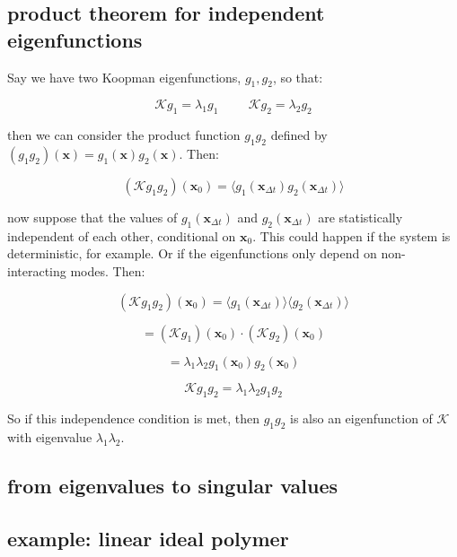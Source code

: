 \documentclass[]{article}
\newcommand{\p}[1]{\left( #1 \right)}
\newcommand{\w}[1]{\mathbf{#1}}
\newcommand{\Kp}{\mathcal{K}}
\begin{document}
\subsection{product theorem for independent eigenfunctions}

Say we have two Koopman eigenfunctions, $g_1, g_2$, so that:

$$
\Kp g_1 = \lambda_1 g_1 \hspace{1cm} \Kp g_2 = \lambda_2 g_2
$$

then we can consider the product function $g_1g_2$ defined by $(g_1g_2)(\w{x}) = g_1(\w{x})g_2(\w{x})$. Then:

$$
\p{\Kp g_1g_2}(\w{x}_0) = \langle g_1(\w{x}_{\Delta t})g_2(\w{x}_{\Delta t})\rangle
$$

now suppose that the values of $g_1(\w{x}_{\Delta t})$ and $g_2(\w{x}_{\Delta t})$ are statistically independent of each other, conditional on $\w{x}_0$. This could happen if the system is deterministic, for example. Or if the eigenfunctions only depend on non-interacting modes. Then:

$$
\p{\Kp g_1g_2}(\w{x}_0) = \langle g_1(\w{x}_{\Delta t})\rangle\langle g_2(\w{x}_{\Delta t})\rangle
$$

$$
= (\Kp g_1)(\w{x}_0) \cdot (\Kp g_2)(\w{x}_0)
$$

$$
= \lambda_1\lambda_2 g_1(\w{x}_0) g_2(\w{x}_0)
$$

$$
\Kp g_1g_2 = \lambda_1\lambda_2 g_1 g_2
$$

So if this independence condition is met, then $g_1g_2$ is also an eigenfunction of $\Kp$ with eigenvalue $\lambda_1\lambda_2$.




\subsection{from eigenvalues to singular values}




\subsection{example: linear ideal polymer}
\end{document}
